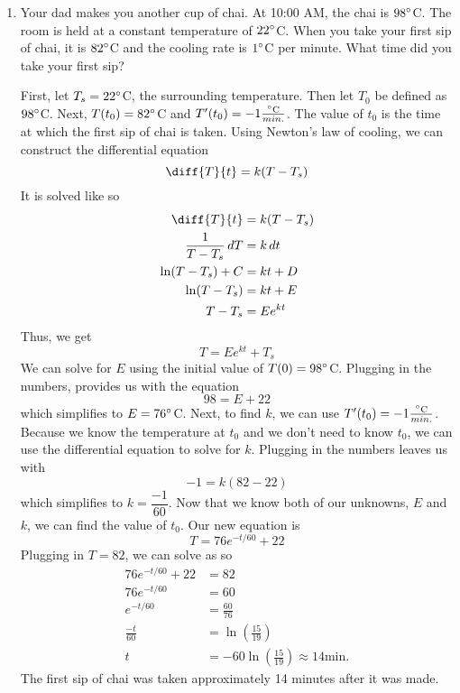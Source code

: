 \documentclass{article}
\begin{document}
\begin{enumerate}[label=\textbf{(2.\arabic*)}]
\newpage

\item Your dad makes you another cup of chai.  At 10:00 AM, the chai is $98\degree$C. The room is held at a constant temperature of $22\degree$C. When you take your first sip of chai, it is $82\degree$C and the cooling rate is $1\degree$C per minute.  What time did you take your first sip?

\vspace{5pt}
First, let $T_s=22\degree$C, the surrounding temperature. Then let $T_0$ be defined as $98\degree$C. Next, $T(t_0)=82\degree$C and $T^\prime(t_0)=-1\frac{\degree\textrm{C}}{min.}$. The value of $t_0$ is the time at which the first sip of chai is taken. Using Newton's law of cooling, we can construct the differential equation
\begin{equation}
\diff{T}{t} = k(T-T_s)
\end{equation}
It is solved like so
\begin{align*}
\diff{T}{t}&= k(T-T_s)\\
\frac{1}{T-T_s}\,dT &= k\,dt\\
\ln(T-T_s)+C&= kt+D\\
\ln(T-T_s)&= kt+E\\
T-T_s &= Ee^{kt}
\end{align*}
Thus, we get
\begin{equation}
T = Ee^{kt}+T_s
\end{equation}
We can solve for $E$ using the initial value of $T(0)=98\degree$C. Plugging in the numbers, provides us with the equation
\[98=E+22\]
which simplifies to $E= 76\degree$C. Next, to find $k$, we can use $T^\prime(t_0)=-1\frac{\degree\textrm{C}}{min.}$. Because we know the temperature at $t_0$ and we don't need to know $t_0$, we can use the differential equation to solve for $k$. Plugging in the numbers leaves us with
\[-1=k(82-22)\]
which simplifies to $k=\dfrac{-1}{60}$. Now that we know both of our unknowns, $E$ and $k$, we can find the value of $t_0$. Our new equation is 
\begin{equation}
T=76e^{-t/60}+22
\end{equation}
Plugging in $T=82$, we can solve as so
\begin{align*}
76e^{-t/60}+22&= 82 \\
 76e^{-t/60}&= 60\\
e^{-t/60}&= \frac{60}{76}\\
\frac{-t}{60}&=\ln\left(\frac{15}{19}\right) \\
t&= -60\ln\left(\frac{15}{19}\right)\approx 14\textrm{min.}
\end{align*}
The first sip of chai was taken approximately 14 minutes after it was made.


\end{enumerate}
\end{document}
